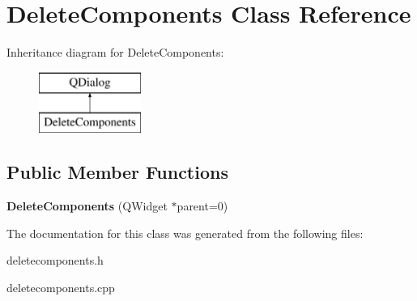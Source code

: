 \hypertarget{classDeleteComponents}{\section{Delete\-Components Class Reference}
\label{classDeleteComponents}
}
Inheritance diagram for Delete\-Components\-:\begin{figure}[H]
\begin{center}
\leavevmode
\includegraphics[height=2.000000cm]{classDeleteComponents}
\end{center}
\end{figure}
\subsection*{Public Member Functions}
\begin{DoxyCompactItemize}
\item 
\hypertarget{classDeleteComponents_a27897b1d60d46c4ca576d60d5a71b0ea}{{\bfseries Delete\-Components} (Q\-Widget $\ast$parent=0)}\label{classDeleteComponents_a27897b1d60d46c4ca576d60d5a71b0ea}

\end{DoxyCompactItemize}


The documentation for this class was generated from the following files\-:\begin{DoxyCompactItemize}
\item 
deletecomponents.\-h\item 
deletecomponents.\-cpp\end{DoxyCompactItemize}
